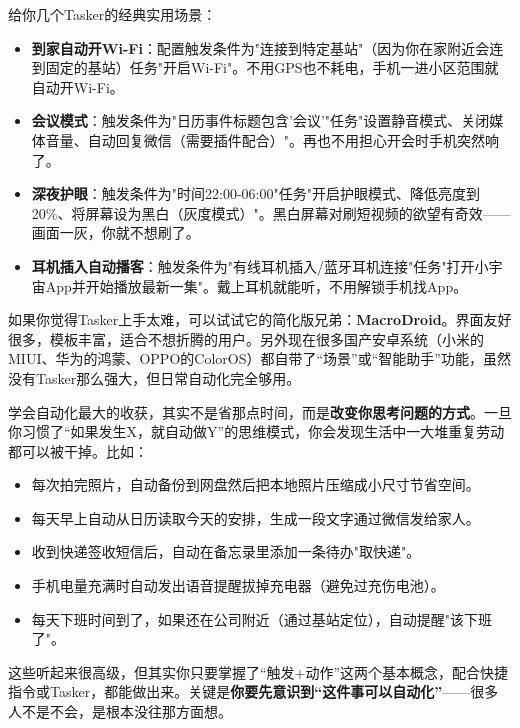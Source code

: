 给你几个Tasker的经典实用场景：

\begin{itemize}
  \item \textbf{到家自动开Wi-Fi}：配置触发条件为"连接到特定基站"（因为你在家附近会连到固定的基站）任务"开启Wi-Fi"。不用GPS也不耗电，手机一进小区范围就自动开Wi-Fi。
  \item \textbf{会议模式}：触发条件为"日历事件标题包含'会议'"任务"设置静音模式、关闭媒体音量、自动回复微信（需要插件配合）"。再也不用担心开会时手机突然响了。
  \item \textbf{深夜护眼}：触发条件为"时间22:00-06:00"任务"开启护眼模式、降低亮度到20\%、将屏幕设为黑白（灰度模式）"。黑白屏幕对刷短视频的欲望有奇效——画面一灰，你就不想刷了。
  \item \textbf{耳机插入自动播客}：触发条件为"有线耳机插入/蓝牙耳机连接"任务"打开小宇宙App并开始播放最新一集"。戴上耳机就能听，不用解锁手机找App。
\end{itemize}

如果你觉得Tasker上手太难，可以试试它的简化版兄弟：\textbf{MacroDroid}。界面友好很多，模板丰富，适合不想折腾的用户。另外现在很多国产安卓系统（小米的MIUI、华为的鸿蒙、OPPO的ColorOS）都自带了“场景”或“智能助手”功能，虽然没有Tasker那么强大，但日常自动化完全够用。


学会自动化最大的收获，其实不是省那点时间，而是\textbf{改变你思考问题的方式}。一旦你习惯了“如果发生X，就自动做Y”的思维模式，你会发现生活中一大堆重复劳动都可以被干掉。比如：

\begin{itemize}
  \item 每次拍完照片，自动备份到网盘然后把本地照片压缩成小尺寸节省空间。
  \item 每天早上自动从日历读取今天的安排，生成一段文字通过微信发给家人。
  \item 收到快递签收短信后，自动在备忘录里添加一条待办"取快递"。
  \item 手机电量充满时自动发出语音提醒拔掉充电器（避免过充伤电池）。
  \item 每天下班时间到了，如果还在公司附近（通过基站定位），自动提醒"该下班了"。
\end{itemize}

这些听起来很高级，但其实你只要掌握了“触发+动作”这两个基本概念，配合快捷指令或Tasker，都能做出来。关键是\textbf{你要先意识到“这件事可以自动化”}——很多人不是不会，是根本没往那方面想。


